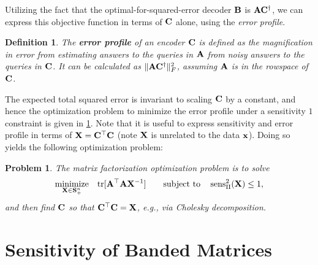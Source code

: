 \documentclass{article}
\newtheorem{definition}{Definition}
\newtheorem{problem}{Problem}
\begin{document}
Utilizing the fact that the optimal-for-squared-error decoder $\mathbf{B}$ is $\mathbf{A} \mathbf{C}^\dagger$, we can express this objective function in terms of $\mathbf{C}$ alone, using the \emph{error profile}.
\begin{definition} \cite{Li2015TheMM}
The \textbf{error profile} of an encoder $\mathbf{C}$ is defined as the magnification in error from estimating answers to the queries in $\mathbf{A}$ from noisy answers to the queries in $\mathbf{C}$.  It can be calculated as $\| \mathbf{A} \mathbf{C}^{\dagger} \|_F^2$, assuming $\mathbf{A}$ is in the rowspace of $\mathbf{C}$.
\end{definition}

The expected total squared error is invariant to scaling $\mathbf{C}$  by a constant, and hence the optimization problem to minimize the error profile under a sensitivity $1$ constraint is given in \cref{prob:optconvex}.
Note that it is useful to express sensitivity and error profile in terms of $\mathbf{X} = \mathbf{C}^\top \mathbf{C}$ (note $\mathbf{X}$ is unrelated to the data $\mathbf{x}$).  Doing so yields the following optimization problem:

\begin{problem} \label{prob:optconvex}
The matrix factorization optimization problem is to solve
\begin{equation} \label{eq:optconvex}
\underset{\mathbf{X} \in \mathbf{S}^{n}_{+}}{\text{minimize}}
\quad
\mathrm{tr}[\mathbf{A}^\top \mathbf{A} \mathbf{X}^{-1}] 
\qquad
\text{subject to}
\quad
\operatorname{sens}_\Pi^2(\mathbf{X}) \leq 1,
\end{equation}
and then find $\mathbf{C}$ so that $\mathbf{C}^\top \mathbf{C} = \mathbf{X}$, e.g., via Cholesky decomposition.
\end{problem}




\section{Sensitivity of Banded Matrices}\label{sec:sensitivity}
\vspace{-0.5em} %
% 
\end{document}
